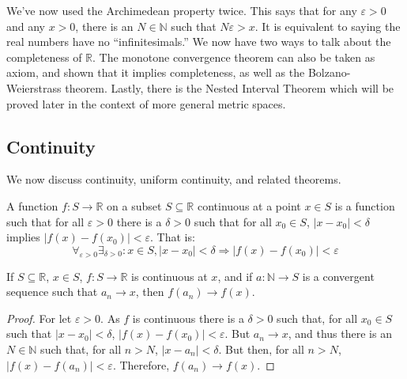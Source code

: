             We've now used the Archimedean property twice. This
            says that for any $\varepsilon>0$ and any
            $x>0$, there is an $N\in\mathbb{N}$ such that
            $N\varepsilon>x$. It is equivalent to saying the
            real numbers have no ``infinitesimals.'' We now
            have two ways to talk about the completeness of
            $\mathbb{R}$. The monotone convergence theorem
            can also be taken as axiom, and shown that it
            implies completeness, as well as the
            Bolzano-Weierstrass theorem. Lastly, there is the
            Nested Interval Theorem which will be proved later
            in the context of more general metric spaces.
        \subsection{Continuity}
            We now discuss continuity, uniform continuity, and
            related theorems.
            \begin{definition}
                A function $f:S\rightarrow\mathbb{R}$
                on a subset $S\subseteq\mathbb{R}$ continuous
                at a point $x\in{S}$ is a function such that
                for all $\varepsilon>0$ there is a $\delta>0$
                such that for all $x_{0}\in{S}$,
                $|x-x_{0}|<\delta$ implies
                $|f(x)-f(x_{0})|<\varepsilon$. That is:
                \begin{equation}
                    \forall_{\varepsilon>0}\exists_{\delta>0}:
                    x\in{S},|x-x_{0}|<\delta
                    \Rightarrow|f(x)-f(x_{0})|<\varepsilon
                \end{equation}
            \end{definition}
            \begin{theorem}
                If $S\subseteq\mathbb{R}$, $x\in{S}$,
                $f:S\rightarrow\mathbb{R}$
                is continuous at $x$, and if
                $a:\mathbb{N}\rightarrow{S}$
                is a convergent sequence such that
                $a_{n}\rightarrow{x}$, then
                $f(a_{n})\rightarrow{f(x)}$.
            \end{theorem}
            \begin{proof}
                For let $\varepsilon>0$. As $f$ is
                continuous there is a $\delta>0$ such that,
                for all $x_{0}\in{S}$
                such that $|x-x_{0}|<\delta$,
                $|f(x)-f(x_{0})|<\varepsilon$.
                But $a_{n}\rightarrow{x}$, and thus there is an
                $N\in\mathbb{N}$ such that, for all $n>N$,
                $|x-a_{n}|<\delta$. But then, for all $n>N$,
                $|f(x)-f(a_{n})|<\varepsilon$. Therefore,
                $f(a_{n})\rightarrow{f(x)}$.
            \end{proof}
